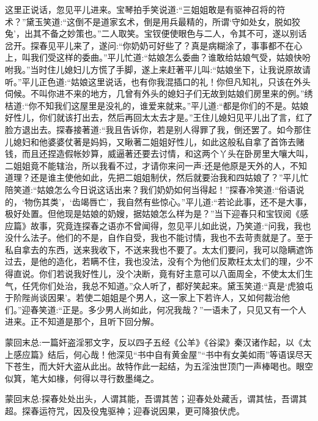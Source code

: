 \begin{parag}
    这里正说话，忽见平儿进来。宝琴拍手笑说道:“三姐姐敢是有驱神召将的符术？”黛玉笑道:“这倒不是道家玄术，倒是用兵最精的，所谓‘守如处女，脱如狡兔’，出其不备之妙策也。”二人取笑。宝钗便使眼色与二人，令其不可，遂以别话岔开。探春见平儿来了，遂问:“你奶奶可好些了？真是病糊涂了，事事都不在心上，叫我们受这样的委曲。”平儿忙道:“姑娘怎么委曲？谁敢给姑娘气受，姑娘快吩咐我。”当时住儿媳妇儿方慌了手脚，遂上来赶著平儿叫:“姑娘坐下，让我说原故请听。”平儿正色道:“姑娘这里说话，也有你我混插口的礼！你但凡知礼，只该在外头伺候。不叫你进不来的地方，几曾有外头的媳妇子们无故到姑娘们房里来的例。”绣桔道:“你不知我们这屋里是没礼的，谁爱来就来。”平儿道:“都是你们的不是。姑娘好性儿，你们就该打出去，然后再回太太去才是。”王住儿媳妇见平儿出了言，红了脸方退出去。探春接著道:“我且告诉你，若是别人得罪了我，倒还罢了。如今那住儿媳妇和他婆婆仗著是妈妈，又瞅著二姐姐好性儿，如此这般私自拿了首饰去赌钱，而且还捏造假帐妙算，威逼著还要去讨情，和这两个丫头在卧房里大嚷大叫，二姐姐竟不能辖治，所以我看不过，才请你来问一声:还是他原是天外的人，不知道理？还是谁主使他如此，先把二姐姐制伏，然后就要治我和四姑娘了？”平儿忙陪笑道:“姑娘怎么今日说这话出来？我们奶奶如何当得起！”探春冷笑道:“俗语说的，‘物伤其类’，‘齿竭唇亡’，我自然有些惊心。”平儿道:“若论此事，还不是大事，极好处置。但他现是姑娘的奶嫂，据姑娘怎么样为是？”当下迎春只和宝钗阅《感应篇》故事，究竟连探春之语亦不曾闻得，忽见平儿如此说，乃笑道:“问我，我也没什么法子。他们的不是，自作自受，我也不能讨情，我也不去苛责就是了。至于私自拿去的东西，送来我收下，不送来我也不要了。太太们要问，我可以隐瞒遮饰过去，是他的造化，若瞒不住，我也没法，没有个为他们反欺枉太太们的理，少不得直说。你们若说我好性儿，没个决断，竟有好主意可以八面周全，不使太太们生气，任凭你们处治，我总不知道。”众人听了，都好笑起来。黛玉笑道:“真是‘虎狼屯于阶陛尚谈因果’。若使二姐姐是个男人，这一家上下若许人，又如何裁治他们。”迎春笑道:“正是。多少男人尚如此，何况我哉？”一语未了，只见又有一个人进来。正不知道是那个，且听下回分解。
\end{parag}


\begin{parag}
    \begin{note}蒙回末总:一篇奸盗淫邪文字，反以四子五经《公羊》《谷梁》秦汉诸作起，以《太上感应篇》结后，何心哉！他深见“书中自有黄金屋”“书中有女美如雨”等语误尽天下苍生，而大奸大盗从此出。故特作此一起结，为五淫浊世顶门一声棒喝也。眼空似箕，笔大如椽，何得以寻行数墨绳之。\end{note}
\end{parag}


\begin{parag}
    \begin{note}蒙回末总:探春处处出头，人谓其能，吾谓其苦；迎春处处藏舌，谓其怯，吾谓其超。探春运符咒，因及役鬼驱神；迎春说因果，更可降狼伏虎。\end{note}
\end{parag}
